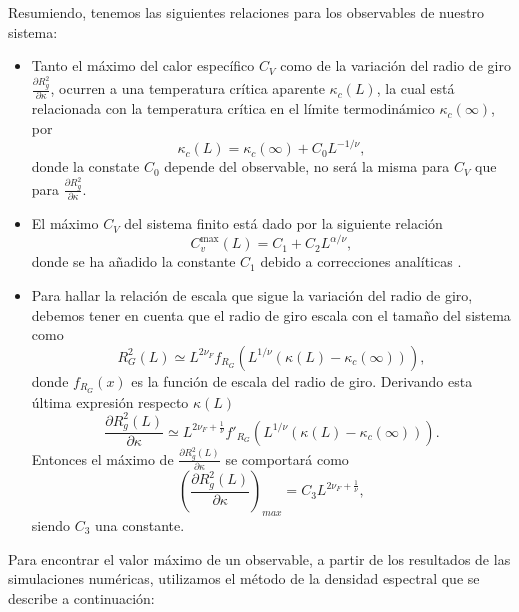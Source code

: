 Resumiendo, tenemos las siguientes relaciones para los observables de nuestro sistema:
\begin{itemize}
\item Tanto el máximo del calor específico $C_V$ como de la variación del
  radio de giro $\frac{\partial R_g^2}{\partial \kappa}$, ocurren a una temperatura crítica
  aparente $\kappa_c(L)$, la cual está relacionada con la temperatura crítica
  en el límite termodinámico $\kappa_c(\infty)$, por
  \begin{equation*}
    \kappa_c(L)=\kappa_c(\infty)+C_0 L^{-1/\nu},
  \end{equation*}
  donde la constate $C_0$ depende del observable, no será la misma para $C_V$
  que para $\frac{\partial R_g^2}{\partial \kappa}$.
\item El máximo $C_V$ del sistema finito está dado por la siguiente relación 
  \begin{equation*}
    C^{\max}_v(L)=C_1+C_2L^{\alpha/\nu},
  \end{equation*}
  donde se ha añadido la constante $C_1$ debido a correcciones analíticas
  \cite{Cardy}. 
\item Para hallar la relación de escala que sigue la variación del radio de
  giro, debemos tener en cuenta que el radio de giro escala con el tamaño del
  sistema como
  \begin{equation*}
    R^2_G(L)\simeq L^{2\nu_F}f_{R_G}\left(L^{1/\nu}(\kappa(L)-\kappa_c(\infty))\right),
  \end{equation*}
  donde $f_{R_G}(x)$ es la función de escala del radio de giro. Derivando esta
  última expresión respecto $\kappa(L)$
  \begin{equation}\label{escala_R2g_conexo}
    \frac{\partial R_g^2(L)}{\partial \kappa}\simeq L^{2\nu_F+\frac{1}{\nu}}f'_{R_G}\left(L^{1/\nu}(\kappa(L)-\kappa_c(\infty))\right).
  \end{equation}
  Entonces el máximo de $\frac{\partial R_g^2(L)}{\partial \kappa}$ se
  comportará como
  \begin{equation*}
    \left( \frac{\partial R_g^2(L)}{\partial \kappa}\right)_{max}=C_3  L^{2\nu_F+\frac{1}{\nu}},
  \end{equation*}
  siendo $C_3$ una constante.
\end{itemize}

Para encontrar el valor máximo de un observable, a partir de los resultados de
las simulaciones numéricas, utilizamos el método de la densidad espectral que
se describe a continuación:

